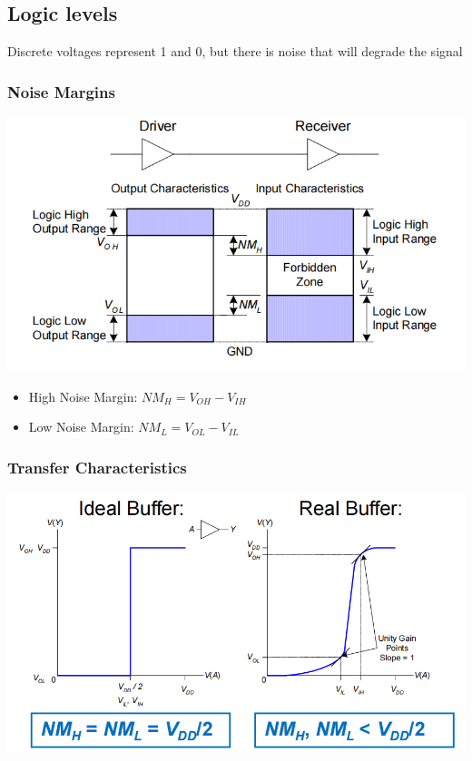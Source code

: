 \documentclass[12pt]{article}
\begin{document}
\subsection{Logic levels}
Discrete voltages represent 1 and 0, but there is noise that will degrade the signal
\subsubsection{Noise Margins}
\includegraphics[width=\textwidth]{NoiseMargins.png}
\begin{itemize}
    \item High Noise Margin: $NM_H = V_{OH}-V_{IH}$
    \item Low Noise Margin: $NM_L = V_{OL}-V_{IL}$
\end{itemize}
\subsubsection{Transfer Characteristics}
\includegraphics[width=\textwidth]{TransferCharacteristics.png}
\end{document}
